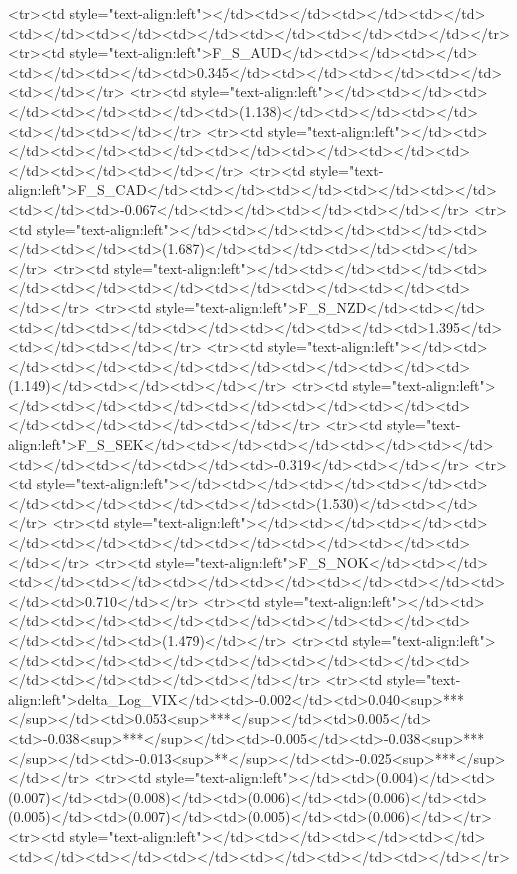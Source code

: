 <tr><td style="text-align:left"></td><td></td><td></td><td></td><td></td><td></td><td></td><td></td><td></td><td></td></tr>
<tr><td style="text-align:left">F_S_AUD</td><td></td><td></td><td></td><td></td><td>0.345</td><td></td><td></td><td></td><td></td></tr>
<tr><td style="text-align:left"></td><td></td><td></td><td></td><td></td><td>(1.138)</td><td></td><td></td><td></td><td></td></tr>
<tr><td style="text-align:left"></td><td></td><td></td><td></td><td></td><td></td><td></td><td></td><td></td><td></td></tr>
<tr><td style="text-align:left">F_S_CAD</td><td></td><td></td><td></td><td></td><td></td><td>-0.067</td><td></td><td></td><td></td></tr>
<tr><td style="text-align:left"></td><td></td><td></td><td></td><td></td><td></td><td>(1.687)</td><td></td><td></td><td></td></tr>
<tr><td style="text-align:left"></td><td></td><td></td><td></td><td></td><td></td><td></td><td></td><td></td><td></td></tr>
<tr><td style="text-align:left">F_S_NZD</td><td></td><td></td><td></td><td></td><td></td><td></td><td>1.395</td><td></td><td></td></tr>
<tr><td style="text-align:left"></td><td></td><td></td><td></td><td></td><td></td><td></td><td>(1.149)</td><td></td><td></td></tr>
<tr><td style="text-align:left"></td><td></td><td></td><td></td><td></td><td></td><td></td><td></td><td></td><td></td></tr>
<tr><td style="text-align:left">F_S_SEK</td><td></td><td></td><td></td><td></td><td></td><td></td><td></td><td>-0.319</td><td></td></tr>
<tr><td style="text-align:left"></td><td></td><td></td><td></td><td></td><td></td><td></td><td></td><td>(1.530)</td><td></td></tr>
<tr><td style="text-align:left"></td><td></td><td></td><td></td><td></td><td></td><td></td><td></td><td></td><td></td></tr>
<tr><td style="text-align:left">F_S_NOK</td><td></td><td></td><td></td><td></td><td></td><td></td><td></td><td></td><td>0.710</td></tr>
<tr><td style="text-align:left"></td><td></td><td></td><td></td><td></td><td></td><td></td><td></td><td></td><td>(1.479)</td></tr>
<tr><td style="text-align:left"></td><td></td><td></td><td></td><td></td><td></td><td></td><td></td><td></td><td></td></tr>
<tr><td style="text-align:left">delta_Log_VIX</td><td>-0.002</td><td>0.040<sup>***</sup></td><td>0.053<sup>***</sup></td><td>0.005</td><td>-0.038<sup>***</sup></td><td>-0.005</td><td>-0.038<sup>***</sup></td><td>-0.013<sup>**</sup></td><td>-0.025<sup>***</sup></td></tr>
<tr><td style="text-align:left"></td><td>(0.004)</td><td>(0.007)</td><td>(0.008)</td><td>(0.006)</td><td>(0.006)</td><td>(0.005)</td><td>(0.007)</td><td>(0.005)</td><td>(0.006)</td></tr>
<tr><td style="text-align:left"></td><td></td><td></td><td></td><td></td><td></td><td></td><td></td><td></td><td></td></tr>
